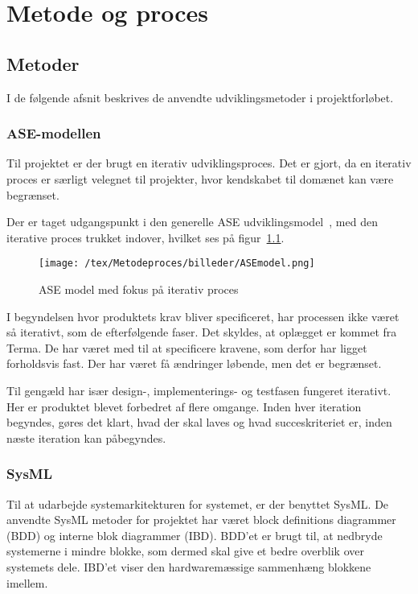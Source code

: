 \chapter{Metode og proces}

\section{Metoder}
I de følgende afsnit beskrives de anvendte udviklingsmetoder i projektforløbet.

\subsection{ASE-modellen}
Til projektet er der brugt en iterativ udviklingsproces. Det er gjort, da en iterativ proces er særligt velegnet til projekter, hvor kendskabet til domænet kan være begrænset. 

\noindent Der er taget udgangspunkt i den generelle ASE udviklingsmodel~\cite{udviklingsproces}, med den iterative proces trukket indover, hvilket ses på figur~\ref{fig:ASE}.
\begin{figure}[H]
	\center
	\texttt{[image: /tex/Metodeproces/billeder/ASEmodel.png]}
	\caption{ASE model med fokus på iterativ proces}
	\label{fig:ASE}
\end{figure}  
\noindent I begyndelsen hvor produktets krav bliver specificeret, har processen ikke været så iterativt, som de efterfølgende faser. Det skyldes, at oplægget er kommet fra Terma. De har været med til at specificere kravene, som derfor har ligget forholdsvis fast. Der har været få ændringer løbende, men det er begrænset.

Til gengæld har især design-, implementerings- og testfasen fungeret iterativt. Her er produktet blevet forbedret af flere omgange. Inden hver iteration begyndes, gøres det klart, hvad der skal laves og hvad succeskriteriet er, inden næste iteration kan påbegyndes. 

\subsection{SysML}
Til at udarbejde systemarkitekturen for systemet, er der benyttet SysML. De anvendte SysML metoder for projektet har været block definitions diagrammer (BDD) og interne blok diagrammer (IBD). BDD'et er brugt til, at nedbryde systemerne i mindre blokke, som dermed skal give et bedre overblik over systemets dele. IBD'et viser den hardwaremæssige sammenhæng blokkene imellem.    

